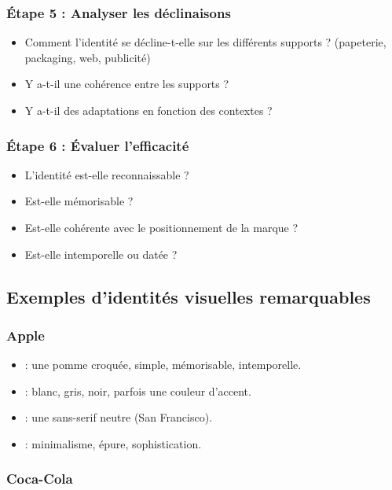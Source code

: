 \subsubsection{Étape 5 : Analyser les déclinaisons}

\begin{itemize}
    \item Comment l'identité se décline-t-elle sur les différents supports ? (papeterie, packaging, web, publicité)
    \item Y a-t-il une cohérence entre les supports ?
    \item Y a-t-il des adaptations en fonction des contextes ?
\end{itemize}

\subsubsection{Étape 6 : Évaluer l'efficacité}

\begin{itemize}
    \item L'identité est-elle reconnaissable ?
    \item Est-elle mémorisable ?
    \item Est-elle cohérente avec le positionnement de la marque ?
    \item Est-elle intemporelle ou datée ?
\end{itemize}

\subsection{Exemples d'identités visuelles remarquables}

\subsubsection{Apple}

\begin{itemize}
    \item {} : une pomme croquée, simple, mémorisable, intemporelle.
    \item {} : blanc, gris, noir, parfois une couleur d'accent.
    \item {} : une sans-serif neutre (San Francisco).
    \item {} : minimalisme, épure, sophistication.
\end{itemize}

\subsubsection{Coca-Cola}

